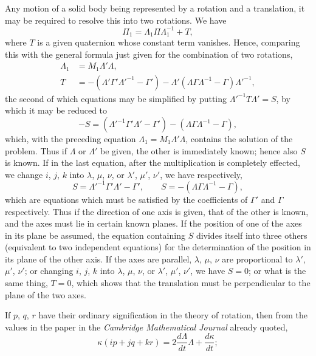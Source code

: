\documentclass[11pt]{article}
\begin{document}
\medskip

Any motion of a solid body being represented by a rotation and a translation, it
may be required to resolve this into two rotations. We have
\[
\Pi_{1} = \Lambda_{1}\Pi\Lambda_{1}^{-1} + T,
\]
where $T$ is a given quaternion whose constant term vanishes. Hence, comparing this
with the general formula just given for the combination of two rotations,
\begin{align*}
\Lambda_{1} &= M_{1}\Lambda'\Lambda,\\
T &= -(\Lambda'\Gamma'\Lambda'^{-1} - \Gamma') - \Lambda'(\Lambda\Gamma\Lambda^{-1} - \Gamma)\Lambda'^{-1},
\end{align*}
the second of which equations may be simplified by putting $\Lambda'^{-1}T\Lambda' = S$, by which
it may be reduced to
\[
-S = (\Lambda'^{-1}\Gamma'\Lambda' - \Gamma') - (\Lambda\Gamma\Lambda^{-1} - \Gamma),
\]
which, with the preceding equation $\Lambda_{1} = M_{1}\Lambda'\Lambda$, contains the solution of the problem.
Thus if $\Lambda$ or $\Lambda'$ be given, the other is immediately known; hence also $S$ is known.
If in the last equation, after the multiplication is completely effected, we change
$i$, $j$, $k$ into $\lambda$, $\mu$, $\nu$, or $\lambda'$, $\mu'$, $\nu'$, we have respectively,
\[
S = \Lambda'^{-1}\Gamma'\Lambda' - \Gamma', \qquad S = -(\Lambda\Gamma\Lambda^{-1} - \Gamma),
\]
which are equations which must be satisfied by the coefficients of $\Gamma'$ and $\Gamma$ respectively.
Thus if the direction of one axis is given, that of the other is known, and the axes
must lie in certain known planes. If the position of one of the axes in its plane be
assumed, the equation containing $S$ divides itself into three others (equivalent to two
independent equations) for the determination of the position in its plane of the other
axis. If the axes are parallel, $\lambda$, $\mu$, $\nu$ are proportional to $\lambda'$, $\mu'$, $\nu'$; or changing
$i$, $j$, $k$ into $\lambda$, $\mu$, $\nu$, or $\lambda'$, $\mu'$, $\nu'$, we have $S = 0$; or what is the same thing, $T = 0$, which
shows that the translation must be perpendicular to the plane of the two axes.

\medskip

If $p$, $q$, $r$ have their ordinary signification in the theory of rotation, then from
the values in the paper in the \textit{Cambridge Mathematical Journal} already quoted,
\[
\kappa(ip + jq + kr) = 2\frac{d\Lambda}{dt}\Lambda + \frac{d\kappa}{dt};
\]

\vfill\pagebreak
\end{document}
